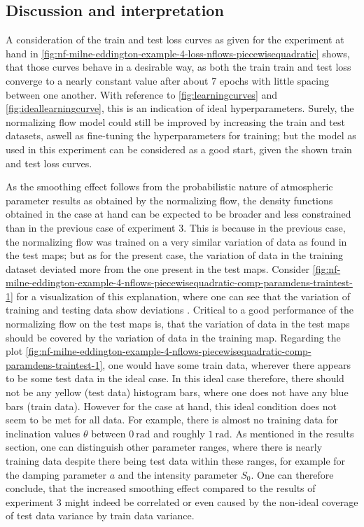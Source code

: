 \documentclass[a4paper,11pt]{report}
\def\fc#1{{\color{black}{#1}}} %
\def\lk#1{{\color{black}{#1}}}
\begin{document}
\subsection{Discussion and interpretation}
A consideration of the train and test loss curves as given for the experiment at hand in \cref{fig:nf-milne-eddington-example-4-loss-nflows-piecewisequadratic} shows, that those curves behave in a desirable way, as both the train train and test loss converge to a nearly constant value after about 7 epochs with little spacing between one another. With reference to \cref{fig:learningcurves} and \cref{fig:ideallearningcurve}, this is an indication of ideal hyperparameters. Surely, the normalizing flow model could still be improved by increasing the train and test datasets, aswell as \fc{by} fine-tuning the hyperparameters for training; but the model as used in this experiment can be considered as a good start, given the shown train and test loss curves.

\fc{Recall, that the smoothing effect of the normalizing flow for the experiment at hand is observed to be stronger than for experiment 3.} As the smoothing effect follows from the probabilistic nature of atmospheric parameter results as obtained by the normalizing flow, the density functions obtained in the case at hand can be expected to be broader and less constrained than in the previous case of experiment 3. This is because in the previous case, the normalizing flow was trained on a very similar variation of data as found in the test maps; but as for the present case, the variation of data in the training dataset deviated more from the one present in the test maps. Consider \cref{fig:nf-milne-eddington-example-4-nflows-piecewisequadratic-comp-paramdens-traintest-1} for a visualization of this explanation, where one can see that the variation of training and testing data show deviations \fc{from one another}. Critical to a good performance of the normalizing flow on the test maps is, that the variation of data in the test maps should be covered by the variation of data in the training map. Regarding the plot \cref{fig:nf-milne-eddington-example-4-nflows-piecewisequadratic-comp-paramdens-traintest-1}, one would have some train data, wherever there appears to be some test data in the ideal case. In this ideal case therefore, there should not be any yellow (test data) histogram bars, where one does not have any blue bars (train data). However for the case at hand, this ideal condition does not seem to be met for all data. For example, there is almost no training data for inclination values $\theta$ between $\SI{0}{\radian}$ and roughly $\SI{1}{\radian}$. As mentioned in the results section, one can distinguish other parameter ranges, where there is nearly \lk{no} training data despite there being test data within these ranges, for example for the damping parameter $a$ and the intensity parameter $S_0$. One can therefore conclude, that the increased smoothing effect compared to the results of experiment 3 might indeed be correlated or even caused by the non-ideal coverage of test data variance by train data variance.
\end{document}
